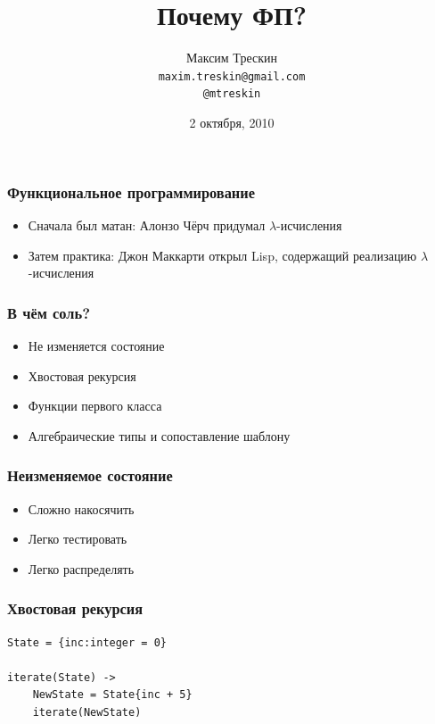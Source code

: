 \documentclass{beamer}
\title{Почему ФП?}
\author{Максим Трескин\\ \texttt{maxim.treskin@gmail.com} \\ \texttt{@mtreskin}}
\date[2010.10.02]{2 октября, 2010}
\begin{document}
\begin{frame}
  \titlepage
\end{frame}




\begin{frame}
  \frametitle{Функциональное программирование}
  \begin{itemize}
  \item Сначала был матан: Алонзо Чёрч придумал $\lambda$-исчисления
    \pause
  \item Затем практика: Джон Маккарти открыл Lisp, содержащий реализацию $\lambda$-исчисления
  \end{itemize}
\end{frame}


\begin{frame}
  \frametitle{В чём соль?}
  \begin{itemize}
  \item Не изменяется состояние
    \pause
  \item Хвостовая рекурсия
    \pause
  \item Функции первого класса
    \pause
  \item Алгебраические типы и сопоставление шаблону
  \end{itemize}
\end{frame}

\begin{frame}
  \frametitle{Неизменяемое состояние}
  \begin{itemize}
  \item Сложно накосячить
    \pause
  \item Легко тестировать
    \pause
  \item Легко распределять
  \end{itemize}
\end{frame}


\begin{frame}[fragile]
  \frametitle{Хвостовая рекурсия}
  \begin{block}{}
\begin{verbatim}
State = {inc:integer = 0}

iterate(State) ->
    NewState = State{inc + 5}
    iterate(NewState)
\end{verbatim}
  \end{block}

\end{frame}
\end{document}
